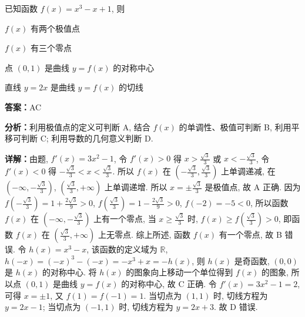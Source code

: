 \begin{question}[points=5]
已知函数 $f(x) = x^3 - x + 1$, 则
\begin{choices}
  \item $f(x)$ 有两个极值点
  \item $f(x)$ 有三个零点
  \item 点 $(0,1)$ 是曲线 $y = f(x)$ 的对称中心
  \item 直线 $y = 2x$ 是曲线 $y = f(x)$ 的切线
\end{choices}
\begin{solution}
\textbf{答案：}AC

\textbf{分析：}利用极值点的定义可判断 A, 结合 $f(x)$ 的单调性、极值可判断 B, 利用平移可判断 C; 利用导数的几何意义判断 D.

\textbf{详解：}由题, $f'(x) = 3x^2 - 1$, 令 $f'(x) > 0$ 得 $x > \frac{\sqrt{3}}{3}$ 或 $x < -\frac{\sqrt{3}}{3}$, 令 $f'(x) < 0$ 得 $-\frac{\sqrt{3}}{3} < x < \frac{\sqrt{3}}{3}$. 所以 $f(x)$ 在 $(-\frac{\sqrt{3}}{3}, \frac{\sqrt{3}}{3})$ 上单调递减, 在 $(-\infty, -\frac{\sqrt{3}}{3})$, $(\frac{\sqrt{3}}{3}, +\infty)$ 上单调递增. 所以 $x = \pm\frac{\sqrt{3}}{3}$ 是极值点, 故 A 正确. 因为 $f(-\frac{\sqrt{3}}{3}) = 1 + \frac{2\sqrt{3}}{9} > 0$, $f(\frac{\sqrt{3}}{3}) = 1 - \frac{2\sqrt{3}}{9} > 0$, $f(-2) = -5 < 0$, 所以函数 $f(x)$ 在 $(-\infty, -\frac{\sqrt{3}}{3})$ 上有一个零点, 当 $x \ge \frac{\sqrt{3}}{3}$ 时, $f(x) \ge f(\frac{\sqrt{3}}{3}) > 0$, 即函数 $f(x)$ 在 $(\frac{\sqrt{3}}{3}, +\infty)$ 上无零点. 综上所述, 函数 $f(x)$ 有一个零点, 故 B 错误. 令 $h(x) = x^3 - x$, 该函数的定义域为 $\mathbb{R}$, $h(-x) = (-x)^3 - (-x) = -x^3 + x = -h(x)$, 则 $h(x)$ 是奇函数, $(0,0)$ 是 $h(x)$ 的对称中心. 将 $h(x)$ 的图象向上移动一个单位得到 $f(x)$ 的图象, 所以点 $(0,1)$ 是曲线 $y = f(x)$ 的对称中心, 故 C 正确. 令 $f'(x) = 3x^2 - 1 = 2$, 可得 $x = \pm 1$, 又 $f(1) = f(-1) = 1$. 当切点为 $(1,1)$ 时, 切线方程为 $y = 2x - 1$; 当切点为 $(-1,1)$ 时, 切线方程为 $y = 2x + 3$. 故 D 错误.
\end{solution}
\end{question}

